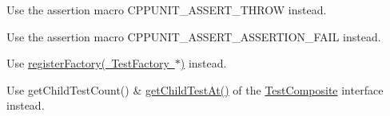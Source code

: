 \begin{DoxyRefList}
%
Use the assertion macro CPPUNIT\+\_\+\+ASSERT\+\_\+\+THROW instead.  
\item[Member \mbox{\hyperlink{group___writing_test_fixture_ga5bdaf0444216a8f93ead13d5ae964d7e}{CPPUNIT\+\_\+\+TEST\+\_\+\+FAIL}} (test\+Method)]\label{deprecated__deprecated000007}%
%
Use the assertion macro CPPUNIT\+\_\+\+ASSERT\+\_\+\+ASSERTION\+\_\+\+FAIL instead.  
\item[Member \mbox{\hyperlink{class_test_factory_registry_aff8d8215ec83fbb77d46706264e2f161}{Test\+Factory\+Registry\+::register\+Factory}} (const std\+::string \&name, \mbox{\hyperlink{class_test_factory}{Test\+Factory}} $\ast$factory)]\label{deprecated__deprecated000008}%
%
Use \mbox{\hyperlink{class_test_factory_registry_a632c38375727ca735e2c1897bd625b99}{register\+Factory( Test\+Factory $\ast$)}} instead.  
\item[Member \mbox{\hyperlink{class_test_suite_aee3f47de38785ddf3a3bf71c958675ff}{Test\+Suite\+::get\+Tests}} () const]\label{deprecated__deprecated000009}%
%
Use get\+Child\+Test\+Count() \& \mbox{\hyperlink{class_test_a9c4acb4752919c160a79e77b2beaa7f5}{get\+Child\+Test\+At()}} of the \mbox{\hyperlink{class_test_composite}{Test\+Composite}} interface instead. 
\end{DoxyRefList}